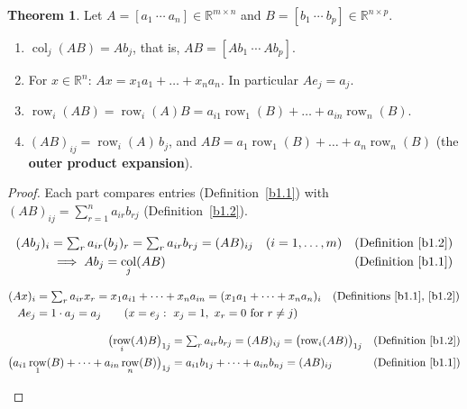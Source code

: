 \documentclass[12pt]{article}
\newcommand{\R}{\mathbb R}
\DeclareMathOperator{\col}{col}
\theoremstyle{definition}
\newtheorem{theorem}{Theorem}
\newcommand{\boardtop}{\vspace*{-\abovedisplayskip}}
\DeclareMathOperator{\row}{row}
\begin{document}
\begin{theorem}\label{b1.4}
Let \(A=[a_1\ \cdots\ a_n]\in\R^{m\times n}\) and \(B=[b_1\ \cdots\ b_p]\in\R^{n\times p}\).
\begin{enumerate}
\item \(\col_j(AB)=Ab_j\), that is, \(AB=[Ab_1\ \cdots\ Ab_p]\).
\item For \(x\in\R^n\): \(Ax=x_1a_1+\dots+x_na_n\). In particular \(Ae_j=a_j\).
\item \(\row_i(AB)=\row_i(A)B=a_{i1}\row_1(B)+\dots+a_{in}\row_n(B)\).
\item \((AB)_{ij}=\row_i(A)\,b_j\), and \(AB=a_1\row_1(B)+\dots+a_n\row_n(B)\) (the \textbf{outer product
expansion}).
\end{enumerate}
\end{theorem}
\begin{proof}
Each part compares entries (Definition~\ref{b1.1}) with \((AB)_{ij}=\sum_{r=1}^na_{ir}b_{rj}\) (Definition~\ref{b1.2}).
\begin{board}
\boardtop
\begin{align*}
(Ab_j)_i&=\textstyle\sum_ra_{ir}(b_j)_r=\sum_ra_{ir}b_{rj}=(AB)_{ij}\quad(i=1,\dots,m)&&\text{(Definition~\ref{b1.2})}\\
&\implies Ab_j=\col_j(AB)&&\text{(Definition~\ref{b1.1})}
\end{align*}
\end{board}
\begin{board}
\boardtop
\begin{align*}
(Ax)_i&=\textstyle\sum_ra_{ir}x_r=x_1a_{i1}+\dots+x_na_{in}=(x_1a_1+\dots+x_na_n)_i&&\text{(Definitions~\ref{b1.1}, \ref{b1.2})}\\
Ae_j&=1\cdot a_j=a_j\qquad(x=e_j:\ x_j=1,\ x_r=0\text{ for }r\ne j)
\end{align*}
\end{board}
\begin{board}[(c) Fix \(i\); \(\row_r(B)=(b_{r1},\dots,b_{rp})\):]
\boardtop
\begin{align*}
\bigl(\row_i(A)B\bigr)_{1j}&=\textstyle\sum_ra_{ir}b_{rj}=(AB)_{ij}=\bigl(\row_i(AB)\bigr)_{1j}&&\text{(Definition~\ref{b1.2})}\\
\bigl(a_{i1}\row_1(B)+\dots+a_{in}\row_n(B)\bigr)_{1j}&=a_{i1}b_{1j}+\dots+a_{in}b_{nj}=(AB)_{ij}&&\text{(Definition~\ref{b1.1})}
\end{align*}
\end{board}

\end{proof}
\end{document}
